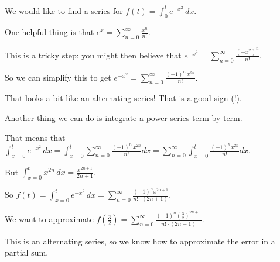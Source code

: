 \documentclass{ximera}
\begin{document}
\begin{question}
\begin{solution}
  \begin{hint}
    We would like to find a series for \(f(t) = \displaystyle\int_0^t e^{-x^2} \, dx\).
  \end{hint}
  \begin{hint}
    One helpful thing is that \(e^x = \displaystyle\sum_{n=0}^\infty \displaystyle\frac{x^n}{n!}\).
  \end{hint}
  \begin{hint}
    This is a tricky step: you might then believe that \(e^{-x^2} = \displaystyle\sum_{n=0}^\infty \displaystyle\frac{\left(-x^2\right)^n}{n!}\).
  \end{hint}
  \begin{hint}
    So we can simplify this to get \(e^{-x^2} = \displaystyle\sum_{n=0}^\infty \displaystyle\frac{(-1)^n \, x^{2n} }{n!}\).
  \end{hint}
  \begin{hint}
    That looks a bit like an alternating series!  That is a good sign (!).
  \end{hint}
  \begin{hint}
    Another thing we can do is integrate a power series term-by-term.
  \end{hint}
  \begin{hint}
    That means that \(\displaystyle\int_{x=0}^t e^{-x^2} \, dx = \displaystyle\int_{x=0}^t \displaystyle\sum_{n=0}^\infty \displaystyle\frac{(-1)^n \, x^{2n} }{n!} dx = \displaystyle\sum_{n=0}^\infty \displaystyle\int_{x=0}^t \displaystyle\frac{(-1)^n x^{2n} }{n!} dx\).
  \end{hint}
  \begin{hint}
    But \(\displaystyle\int_{x=0}^t x^{2n} \, dx = \displaystyle\frac{x^{2n+1} }{2n+1}\).
  \end{hint}
  \begin{hint}
    So \(f(t) = \displaystyle\int_{x=0}^t e^{-x^2} \, dx = \displaystyle\sum_{n=0}^\infty \displaystyle\frac{(-1)^n x^{2n+1} }{n! \cdot (2n+1)}\).
  \end{hint}
  \begin{hint}
    We want to approximate \(f\left(\displaystyle\frac{3}{2}\right) = \displaystyle\sum_{n=0}^\infty \displaystyle\frac{(-1)^n \left(\displaystyle\frac{3}{2}\right)^{2n+1} }{n! \cdot (2n+1)}\).
  \end{hint}
  \begin{hint}
    This is an alternating series, so we know how to approximate the error in a partial sum.
  \end{hint}

\end{solution}
\end{question}
\end{document}
